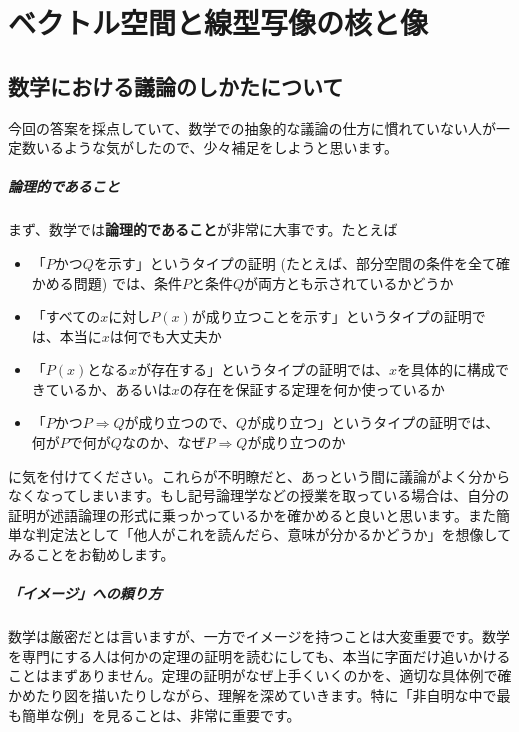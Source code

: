\chapter{ベクトル空間と線型写像の核と像}




\section{数学における議論のしかたについて}

今回の答案を採点していて、数学での抽象的な議論の仕方に慣れていない人が一定数いるような気がしたので、少々補足をしようと思います。

\paragraph{論理的であること}

まず、数学では\textbf{論理的であること}が非常に大事です。たとえば
\begin{itemize}
\item 「$P$かつ$Q$を示す」というタイプの証明 (たとえば、部分空間の条件を全て確かめる問題) では、条件$P$と条件$Q$が両方とも示されているかどうか
\item 「すべての$x$に対し$P(x)$が成り立つことを示す」というタイプの証明では、本当に$x$は何でも大丈夫か
\item 「$P(x)$となる$x$が存在する」というタイプの証明では、$x$を具体的に構成できているか、あるいは$x$の存在を保証する定理を何か使っているか
\item 「$P$かつ$P\Rightarrow Q$が成り立つので、$Q$が成り立つ」というタイプの証明では、何が$P$で何が$Q$なのか、なぜ$P\Rightarrow Q$が成り立つのか
\end{itemize}
に気を付けてください。これらが不明瞭だと、あっという間に議論がよく分からなくなってしまいます。もし記号論理学などの授業を取っている場合は、自分の証明が述語論理の形式に乗っかっているかを確かめると良いと思います。また簡単な判定法として「他人がこれを読んだら、意味が分かるかどうか」を想像してみることをお勧めします。

\paragraph{「イメージ」への頼り方}

数学は厳密だとは言いますが、一方でイメージを持つことは大変重要です。数学を専門にする人は何かの定理の証明を読むにしても、本当に字面だけ追いかけることはまずありません。定理の証明がなぜ上手くいくのかを、適切な具体例で確かめたり図を描いたりしながら、理解を深めていきます。特に「非自明な中で最も簡単な例」を見ることは、非常に重要です。


